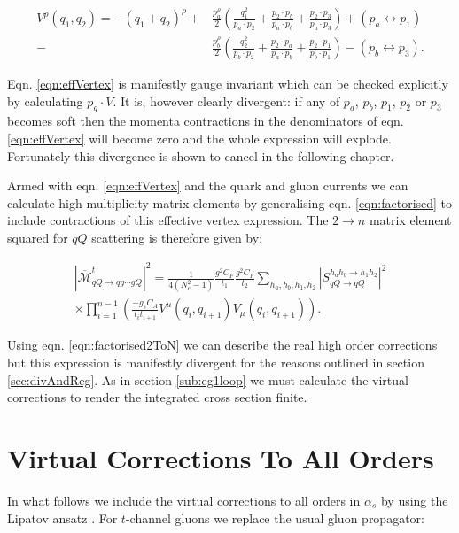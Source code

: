 		\begin{align}
			V^\rho(q_1, q_2) = -(q_1 + q_2)^\rho +
			&\frac{p_a^\rho}{2}\left(\frac{q^2_1}{p_a\cdot p_2} + \frac{p_2 \cdot p_b}{p_a \cdot p_b} + \frac{p_2 \cdot p_3}{p_a \cdot p_3}\right) + (p_a\leftrightarrow p_1) \\
			- &\frac{p_b^\rho}{2}\left(\frac{q^2_2}{p_b\cdot p_2} + \frac{p_2 \cdot p_a}{p_a \cdot p_b} + \frac{p_2 \cdot p_1}{p_b \cdot p_1}\right) - (p_b\leftrightarrow p_3).
			\label{eqn:effVertex}
		\end{align}

		Eqn. \eqref{eqn:effVertex} is manifestly gauge invariant which can be checked explicitly by
		calculating $p_g\cdot V$.  It is, however clearly divergent:  if any of $p_a$, $p_b$, $p_1$,
		$p_2$ or $p_3$ becomes soft then the momenta contractions in the denominators of eqn.
		\eqref{eqn:effVertex} will become zero and the whole expression will explode.  Fortunately
		this divergence is shown to cancel in the following chapter.

		Armed with eqn. \eqref{eqn:effVertex} and the quark and gluon
		currents we can calculate high multiplicity matrix elements by generalising eqn.
		\eqref{eqn:factorised} to include contractions of this effective vertex expression.  The
		$2\rightarrow n$ matrix element squared for $qQ$ scattering is therefore given by:

		\begin{align}
			|\overline{\mathcal{M}}^t_{qQ\rightarrow qg\cdots gQ}|^2 = \frac{1}{4(N_c^2-1)}
			\frac{g^2C_F}{t_1}\frac{g^2C_F}{t_2} \sum_{h_a, h_b, h_1, h_2}
			|S_{qQ\rightarrow qQ}^{h_ah_b\rightarrow h_1h_2}|^2\\
			\times\prod_{i=1}^{n-1}\left(\frac{-g_sC_A}{t_it_{i+1}}V^\mu(q_i, q_{i+1})V_\mu(q_i, q_{i+1})\right).
			\label{eqn:factorised2ToN}
		\end{align}

		Using eqn. \eqref{eqn:factorised2ToN} we can describe the real high order corrections
		but this expression is manifestly divergent for the reasons outlined in section
		\ref{sec:divAndReg}.  As in section \ref{sub:eg1loop} we must calculate the virtual
		corrections to render the integrated cross section finite.

	\section{Virtual Corrections To All Orders}
		\label{sub:virtuals}

		In what follows we include the virtual corrections to all orders in $\alpha_s$ by using
		the Lipatov ansatz \cite{Kuraev:1976ge}.  For $t$-channel gluons we replace the usual
		gluon propagator:

